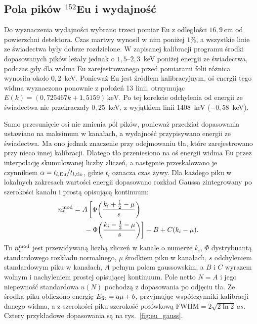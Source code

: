 \documentclass[twocolumn,a4paper,10pt]{article}
\begin{document}
\subsection*{Pola pików $^{152}$Eu i wydajność}
Do wyznaczenia wydajności wybrano trzeci pomiar Eu
z odległości $16{,}9~\mathrm{cm}$ od powierzchni detektora. Czas martwy wynosił
w nim poniżej $1\%$, a wszystkie linie ze świadectwa
były dobrze rozdzielone. W zapisanej kalibracji
programu środki dopasowanych pików leżały jednak
o $1{,}5$--$2{,}3$~keV poniżej energii ze świadectwa,
podczas gdy dla widma Eu zarejestrowanego przed
pomiarami folii różnica wynosiła około $0{,}2$~keV.
Ponieważ Eu jest źródłem kalibracyjnym, oś energii
tego widma wyznaczono ponownie z położeń 13 linii,
otrzymując
$E(k)=(0{,}725467k+1{,}5159)\,\mathrm{keV}$.
Po tej korekcie odchylenia od energii ze świadectwa
nie przekraczały $0{,}25$~keV, z wyjątkiem linii
1408~keV ($-0{,}58$~keV).

Samo przesunięcie osi nie zmienia pól pików,
ponieważ przedział dopasowania ustawiano na maksimum
w kanałach, a wydajność przypisywano energii ze
świadectwa. Ma ono jednak znaczenie przy odejmowaniu
tła, które zarejestrowano przy nieco innej kalibracji. Dlatego tło przeniesiono na oś
energii widma Eu przez interpolację skumulowanej
liczby zliczeń, a następnie przeskalowano je czynnikiem
$\alpha=t_{l,\rm Eu}/t_{l,\rm tlo}$, gdzie $t_l$ oznacza
czas żywy. Dla każdego piku w lokalnych zakresach wartości energii dopasowano rozkład Gaussa
zintegrowany po szerokości kanału i prostą opisującą kontinuum:
\begin{equation}
\begin{aligned}
n_i^{\rm mod}={}&A\left[
\Phi\!\left(\frac{k_i+\frac12-\mu}{s}\right)\right.\\
&\left.{}-\Phi\!\left(\frac{k_i-\frac12-\mu}{s}\right)
\right]+B+C(k_i-\mu).
\end{aligned}
\label{eq:gauss}
\end{equation}
Tu $n_i^{\rm mod}$ jest przewidywaną liczbą zliczeń
w kanale o numerze $k_i$, $\Phi$ dystrybuantą
standardowego rozkładu normalnego, $\mu$ środkiem piku
w kanałach, $s$ odchyleniem standardowym piku w kanałach,
$A$ pełnym polem gaussowskim, a $B$ i $C$ wyrazem wolnym
i nachyleniem prostej opisującej kontinuum. Pole netto
$N=A$ i jego niepewność standardowa $u(N)$ pochodzą
z dopasowania po odjęciu tła. Ze środka piku obliczono
energię $E_{\rm fit}=a\mu+b$, przyjmując współczynniki
kalibracji danego widma, a z szerokości piku
szerokość połówkową
$\mathrm{FWHM}=2\sqrt{2\ln2}\,a s$. Cztery przykładowe
dopasowania są na rys.~\ref{fig:eu_gauss}.
\end{document}
